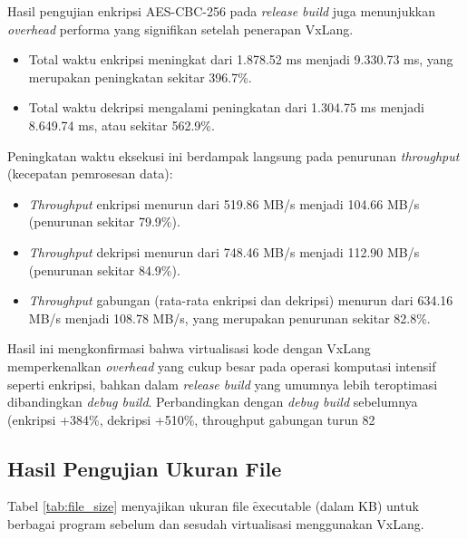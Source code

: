 Hasil pengujian enkripsi AES-CBC-256 pada \textit{release build} juga menunjukkan \textit{overhead} performa yang signifikan setelah penerapan VxLang.
\begin{itemize}
    \item Total waktu enkripsi meningkat dari 1.878.52 ms menjadi 9.330.73 ms, yang merupakan peningkatan sekitar 396.7\%.
    \item Total waktu dekripsi mengalami peningkatan dari 1.304.75 ms menjadi 8.649.74 ms, atau sekitar 562.9\%.
\end{itemize}
Peningkatan waktu eksekusi ini berdampak langsung pada penurunan \textit{throughput} (kecepatan pemrosesan data):
\begin{itemize}
    \item \textit{Throughput} enkripsi menurun dari 519.86 MB/s menjadi 104.66 MB/s (penurunan sekitar 79.9\%).
    \item \textit{Throughput} dekripsi menurun dari 748.46 MB/s menjadi 112.90 MB/s (penurunan sekitar 84.9\%).
    \item \textit{Throughput} gabungan (rata-rata enkripsi dan dekripsi) menurun dari 634.16 MB/s menjadi 108.78 MB/s, yang merupakan penurunan sekitar 82.8\%.
\end{itemize}
Hasil ini mengkonfirmasi bahwa virtualisasi kode dengan VxLang memperkenalkan \textit{overhead} yang cukup besar pada operasi komputasi intensif seperti enkripsi, bahkan dalam \textit{release build} yang umumnya lebih teroptimasi dibandingkan \textit{debug build}. Perbandingkan dengan \textit{debug build} sebelumnya (enkripsi +384\%, dekripsi +510\%, throughput gabungan turun 82%

\subsection{Hasil Pengujian Ukuran File}
Tabel \ref{tab:file_size} menyajikan ukuran file \f{executable} (dalam KB) untuk berbagai program sebelum dan sesudah virtualisasi menggunakan VxLang.

